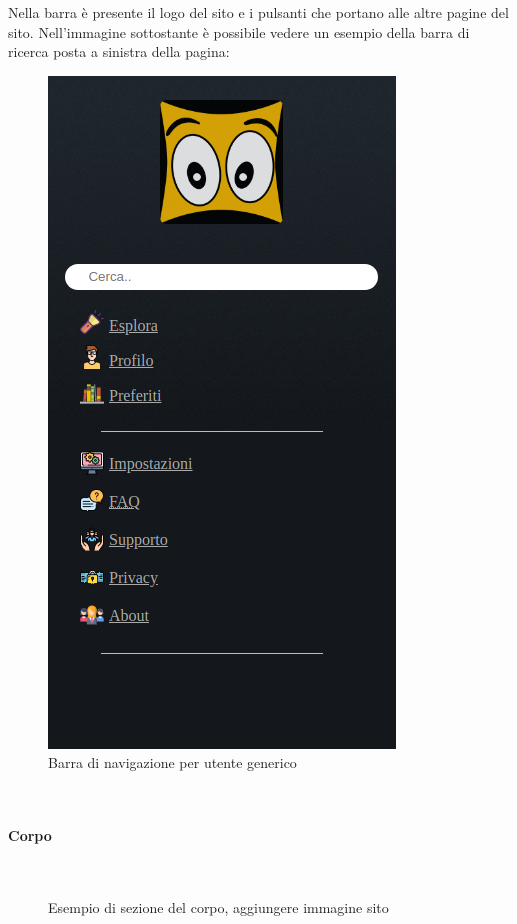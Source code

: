 Nella barra è presente il logo del sito e i pulsanti che portano alle altre pagine del sito. Nell'immagine sottostante è possibile vedere un esempio della barra di ricerca posta a sinistra della pagina: 
\begin{figure}[h!]  				%
	\centerline{\includegraphics[scale=0.45]{img/nav_bar.png}}
	\caption{Barra di navigazione per utente generico}
	\label{fig:navbarGU}
\end{figure}
~\\

\newpage

\paragraph{Corpo}
~\\

\begin{figure}[h!]
	\caption{Esempio di sezione del corpo, aggiungere immagine sito}
	\label{fig:corpoGU}
\end{figure}
